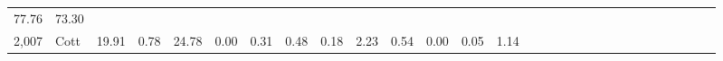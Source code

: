 \documentclass[]{article}
\begin{document}
\begin{longtable}[]{@{}rlrrrrrrrrrrrrrrrrrrrrrrrrrrr@{}}
\begin{minipage}[t]{0.01\columnwidth}
77.76\strut
\end{minipage} & \begin{minipage}[t]{0.01\columnwidth}\raggedleft\strut
73.30\strut
\end{minipage}\tabularnewline
\begin{minipage}[t]{0.01\columnwidth}\raggedleft\strut
2,007\strut
\end{minipage} & \begin{minipage}[t]{0.02\columnwidth}\raggedright\strut
Cott\strut
\end{minipage} & \begin{minipage}[t]{0.01\columnwidth}\raggedleft\strut
19.91\strut
\end{minipage} & \begin{minipage}[t]{0.02\columnwidth}\raggedleft\strut
0.78\strut
\end{minipage} & \begin{minipage}[t]{0.02\columnwidth}\raggedleft\strut
24.78\strut
\end{minipage} & \begin{minipage}[t]{0.02\columnwidth}\raggedleft\strut
0.00\strut
\end{minipage} & \begin{minipage}[t]{0.01\columnwidth}\raggedleft\strut
0.31\strut
\end{minipage} & \begin{minipage}[t]{0.01\columnwidth}\raggedleft\strut
0.48\strut
\end{minipage} & \begin{minipage}[t]{0.01\columnwidth}\raggedleft\strut
0.18\strut
\end{minipage} & \begin{minipage}[t]{0.01\columnwidth}\raggedleft\strut
2.23\strut
\end{minipage} & \begin{minipage}[t]{0.01\columnwidth}\raggedleft\strut
0.54\strut
\end{minipage} & \begin{minipage}[t]{0.01\columnwidth}\raggedleft\strut
0.00\strut
\end{minipage} & \begin{minipage}[t]{0.02\columnwidth}\raggedleft\strut
0.05\strut
\end{minipage} & \begin{minipage}[t]{0.02\columnwidth}\raggedleft\strut
1.14\strut
\end{minipage} & \begin{minipage}[t]{0.02\columnwidth}\raggedleft\strut

\end{minipage}
\end{longtable}
\end{document}
